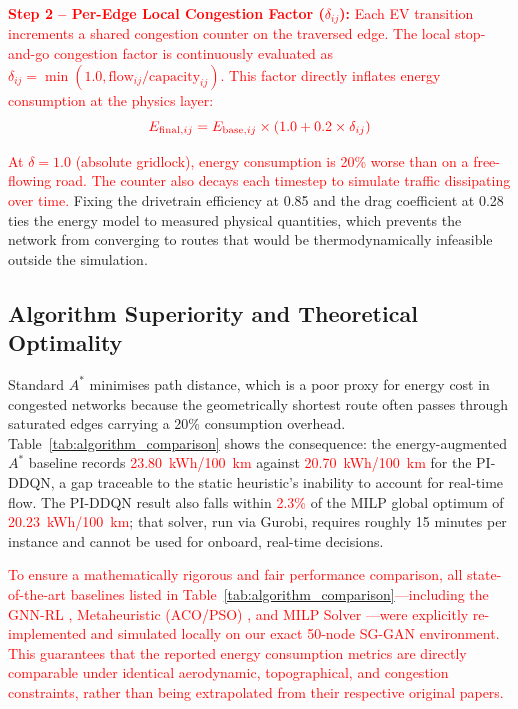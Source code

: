 \documentclass[conference]{IEEEtran}
\begin{document}
\textcolor{red}{\textbf{Step 2 -- Per-Edge Local Congestion Factor ($\delta_{ij}$):} Each EV transition increments a shared congestion counter on the traversed edge. The local stop-and-go congestion factor is continuously evaluated as $\delta_{ij} = \min(1.0, \text{flow}_{ij} / \text{capacity}_{ij})$. This factor directly inflates energy consumption at the physics layer:}
\begin{equation}
\textcolor{red}{E_{\text{final},ij} = E_{\text{base},ij} \times (1.0 + 0.2 \times \delta_{ij})}
\end{equation}

\textcolor{red}{At $\delta=1.0$ (absolute gridlock), energy consumption is 20\% worse than on a free-flowing road. The counter also decays each timestep to simulate traffic dissipating over time.} Fixing the drivetrain efficiency at 0.85 and the drag coefficient at 0.28 ties the energy model to measured physical quantities, which prevents the network from converging to routes that would be thermodynamically infeasible outside the simulation.

\subsection{Algorithm Superiority and Theoretical Optimality}
Standard $A^*$ minimises path distance, which is a poor proxy for energy cost in congested networks because the geometrically shortest route often passes through saturated edges carrying a 20\% consumption overhead. Table~\ref{tab:algorithm_comparison} shows the consequence: the energy-augmented $A^*$ baseline records \textcolor{red}{23.80~kWh/100~km} against \textcolor{red}{20.70~kWh/100~km} for the PI-DDQN, a gap traceable to the static heuristic's inability to account for real-time flow. The PI-DDQN result also falls within \textcolor{red}{2.3\%} of the MILP global optimum of \textcolor{red}{20.23~kWh/100~km}; that solver, run via Gurobi, requires roughly 15 minutes per instance and cannot be used for onboard, real-time decisions.

\textcolor{red}{To ensure a mathematically rigorous and fair performance comparison, all state-of-the-art baselines listed in Table~\ref{tab:algorithm_comparison}—including the GNN-RL \cite{gnn_rl_ev}, Metaheuristic (ACO/PSO) \cite{pso_routing}, and MILP Solver \cite{milp_ev}—were explicitly re-implemented and simulated locally on our exact 50-node SG-GAN environment. This guarantees that the reported energy consumption metrics are directly comparable under identical aerodynamic, topographical, and congestion constraints, rather than being extrapolated from their respective original papers.}
\end{document}
